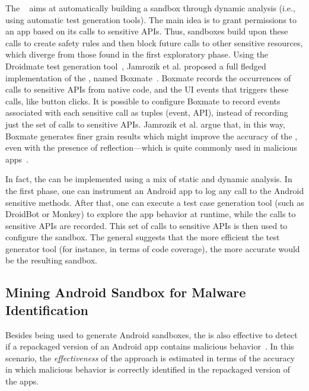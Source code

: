 The \mas~\cite{DBLP:conf/icse/JamrozikSZ16} aims at automatically
building a sandbox through dynamic analysis (i.e., using automatic test generation tools).
The main idea is to grant permissions to an app based on its calls to sensitive APIs.
Thus, sandboxes build upon these calls to create safety rules and then block future
calls to other sensitive resources, which diverge from those found in the first exploratory
phase. Using the Droidmate test generation tool~\cite{DBLP:conf/icse/JamrozikZ16},
Jamrozik et al. proposed a full fledged
implementation of the \mas, named Boxmate~\cite{DBLP:conf/icse/JamrozikSZ16}. 
Boxmate records the occurrences of calls to sensitive APIs from native code, and the UI events that triggers these calls,
like button clicks. It is possible to configure Boxmate to record events associated with each sensitive call as
tuples (event, API), instead of recording just the set of calls to sensitive APIs. Jamrozik et al. argue that, in this way, Boxmate generates finer
grain results which
might improve the accuracy of the \mas, even with the presence of reflection---which is quite commonly used in
malicious apps~\cite{DBLP:conf/issta/0029BOK16}.

In fact, the \mas can be implemented using
a mix of static and dynamic analysis. In the first phase, one
can instrument an Android app to log any call to the Android sensitive methods.
After that, one can execute a test case generation tool (such as DroidBot
or Monkey) to explore the app behavior at runtime,
while the calls to sensitive APIs are recorded.
This set of calls to sensitive APIs is then used
to configure the sandbox. The general \mas %
suggests that the more efficient the test generator tool (for instance, in terms of code coverage),
the more accurate would be the resulting sandbox.



\subsection{Mining Android Sandbox for Malware Identification}

Besides being used to generate Android sandboxes, the \mas is also effective 
to detect if a repackaged version of an Android app contains malicious
behavior~\cite{DBLP:conf/wcre/BaoLL18}. In this scenario, the \emph{effectiveness} of the approach
is estimated in terms of the accuracy in which malicious behavior is correctly identified in the repackaged version of the
apps.


